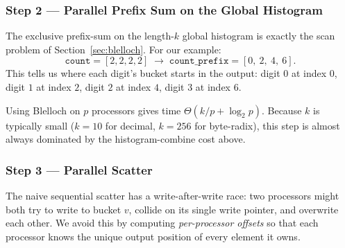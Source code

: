 \subsubsection{Step 2 --- Parallel Prefix Sum on the Global Histogram}
The exclusive prefix-sum on the length-$k$ global histogram is exactly
the scan problem of Section~\ref{sec:blelloch}. For our example:
\[
\texttt{count} = [2,2,2,2]
\;\longrightarrow\;
\texttt{count\_prefix} = [0,\ 2,\ 4,\ 6].
\]
This tells us where each digit's bucket starts in the output:
digit $0$ at index $0$, digit $1$ at index $2$, digit $2$ at index $4$,
digit $3$ at index $6$.

Using Blelloch on $p$ processors gives time
$\Theta(k/p + \log_2 p)$. Because $k$ is typically small ($k=10$ for
decimal, $k=256$ for byte-radix), this step is almost always dominated
by the histogram-combine cost above.

\subsubsection{Step 3 --- Parallel Scatter}

The naive sequential scatter has a write-after-write race: two
processors might both try to write to bucket $v$, collide on its single
write pointer, and overwrite each other. We avoid this by computing
\emph{per-processor offsets} so that each processor knows the unique
output position of every element it owns.

